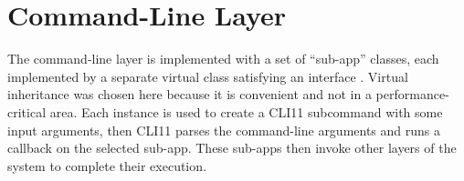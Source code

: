 \section{Command-Line Layer}
The command-line layer is implemented with a set of ``sub-app'' classes, each implemented by a separate virtual class satisfying an interface .
Virtual inheritance was chosen here because it is convenient and not in a performance-critical area.
Each  instance is used to create a CLI11 subcommand with some input arguments, then CLI11 parses the command-line arguments and runs a callback on the selected sub-app.
These sub-apps then invoke other layers of the system to complete their execution.